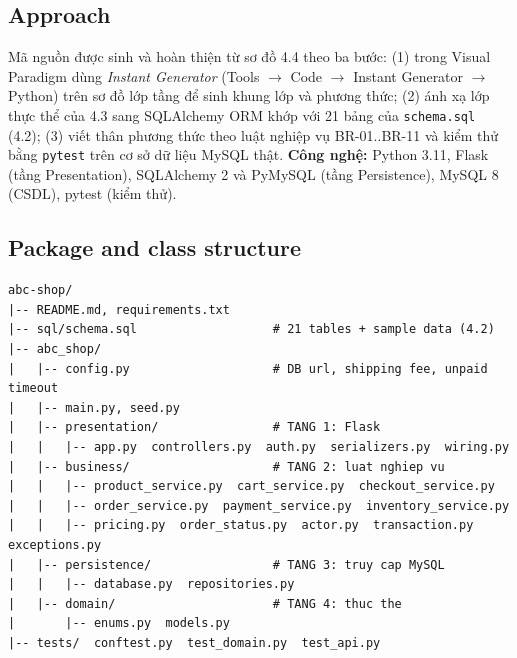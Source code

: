 \documentclass[12pt,a4paper,oneside]{report}
\begin{document}
\subsection{Approach}
Mã nguồn được sinh và hoàn thiện từ sơ đồ 4.4 theo ba bước: (1) trong Visual Paradigm dùng \emph{Instant Generator} (Tools $\rightarrow$ Code $\rightarrow$ Instant Generator $\rightarrow$ Python) trên sơ đồ lớp tầng để sinh khung lớp và phương thức; (2) ánh xạ lớp thực thể của 4.3 sang SQLAlchemy ORM khớp với 21 bảng của \texttt{schema.sql} (4.2); (3) viết thân phương thức theo luật nghiệp vụ BR-01..BR-11 và kiểm thử bằng \texttt{pytest} trên cơ sở dữ liệu MySQL thật.
\textbf{Công nghệ:} Python 3.11, Flask (tầng Presentation), SQLAlchemy 2 và PyMySQL (tầng Persistence), MySQL 8 (CSDL), pytest (kiểm thử).
\subsection{Package and class structure}
\begin{lstlisting}[language={},caption={Cấu trúc thư mục dự án},label={lst:tree}]
abc-shop/
|-- README.md, requirements.txt
|-- sql/schema.sql                   # 21 tables + sample data (4.2)
|-- abc_shop/
|   |-- config.py                    # DB url, shipping fee, unpaid timeout
|   |-- main.py, seed.py
|   |-- presentation/                # TANG 1: Flask
|   |   |-- app.py  controllers.py  auth.py  serializers.py  wiring.py
|   |-- business/                    # TANG 2: luat nghiep vu
|   |   |-- product_service.py  cart_service.py  checkout_service.py
|   |   |-- order_service.py  payment_service.py  inventory_service.py
|   |   |-- pricing.py  order_status.py  actor.py  transaction.py  exceptions.py
|   |-- persistence/                 # TANG 3: truy cap MySQL
|   |   |-- database.py  repositories.py
|   |-- domain/                      # TANG 4: thuc the
|       |-- enums.py  models.py
|-- tests/  conftest.py  test_domain.py  test_api.py
\end{lstlisting}
\end{document}

